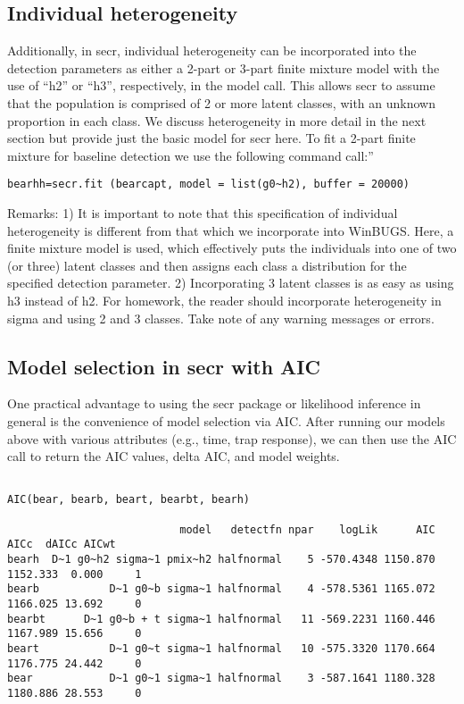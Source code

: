 \subsection{Individual heterogeneity}

Additionally, in secr,  individual heterogeneity can be incorporated
into the detection parameters as either a 2-part or 3-part finite
mixture model with the use of ``h2'' or ``h3'', respectively, in the
model call.    This allows secr to assume that the population is
comprised of 2 or more latent classes, with an unknown proportion in
each class.  We discuss heterogeneity in more detail in the next
section but provide just the basic model for secr here.  To fit a
2-part finite mixture for baseline detection we use the following
command call:''

\begin{verbatim} 
bearhh=secr.fit (bearcapt, model = list(g0~h2), buffer = 20000)
\end{verbatim} 

Remarks:  1) It is important to note that this specification of
individual heterogeneity is different from that which we incorporate
into WinBUGS.  Here, a finite mixture model is used, which effectively
puts the individuals into one of two (or three) latent classes and
then assigns each class a distribution for the specified detection
parameter.  2) Incorporating 3 latent classes is as easy as using h3
instead of h2.  For homework, the reader should incorporate
heterogeneity in sigma and using 2 and 3 classes.   Take note of any
warning messages or errors.

\subsection{Model selection in secr with AIC}

One practical advantage to using the secr package or likelihood
inference in general is the convenience of model selection via AIC.
After running our models above with various attributes (e.g., time,
trap response), we can then use the AIC call to return the AIC values,
delta AIC, and model weights.

\begin{verbatim}

AIC(bear, bearb, beart, bearbt, bearh)

                           model   detectfn npar    logLik      AIC     AICc  dAICc AICwt
bearh  D~1 g0~h2 sigma~1 pmix~h2 halfnormal    5 -570.4348 1150.870 1152.333  0.000     1
bearb           D~1 g0~b sigma~1 halfnormal    4 -578.5361 1165.072 1166.025 13.692     0
bearbt      D~1 g0~b + t sigma~1 halfnormal   11 -569.2231 1160.446 1167.989 15.656     0
beart           D~1 g0~t sigma~1 halfnormal   10 -575.3320 1170.664 1176.775 24.442     0
bear            D~1 g0~1 sigma~1 halfnormal    3 -587.1641 1180.328 1180.886 28.553     0
\end{verbatim}

